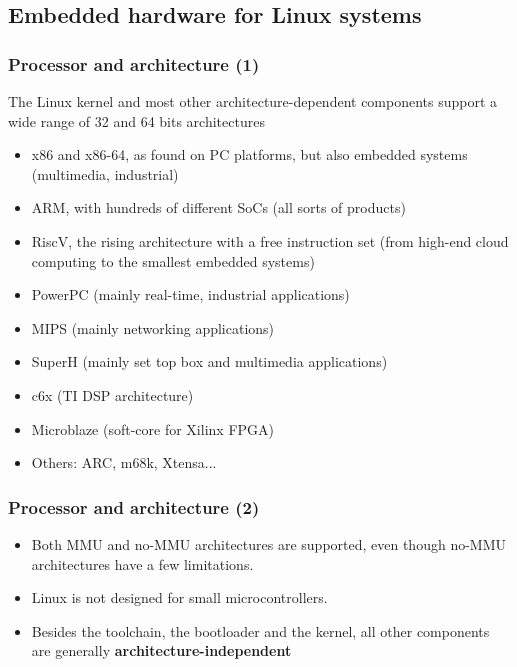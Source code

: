 \subsection{Embedded hardware for Linux systems}

\begin{frame}
  \frametitle{Processor and architecture (1)}
  The Linux kernel and most other architecture-dependent
  components support a wide range of 32 and 64 bits architectures
  \begin{itemize}
  \item x86 and x86-64, as found on PC platforms, but also embedded systems
    (multimedia, industrial)
  \item ARM, with hundreds of different SoCs (all sorts of products)
  \item RiscV, the rising architecture with a free instruction set
        (from high-end cloud computing to the smallest embedded systems)
  \item PowerPC (mainly real-time, industrial applications)
  \item MIPS (mainly networking applications)
  \item SuperH (mainly set top box and multimedia applications)
  \item c6x (TI DSP architecture)
  \item Microblaze (soft-core for Xilinx FPGA)
  \item Others: ARC, m68k, Xtensa...
  \end{itemize}
\end{frame}

\begin{frame}
  \frametitle{Processor and architecture (2)}
  \begin{itemize}
  \item Both MMU and no-MMU architectures are supported, even though
    no-MMU architectures have a few limitations.
  \item Linux is not designed for small microcontrollers.
  \item Besides the toolchain, the bootloader and the kernel, all
    other components are generally {\bf architecture-independent}
  \end{itemize}
\end{frame}

